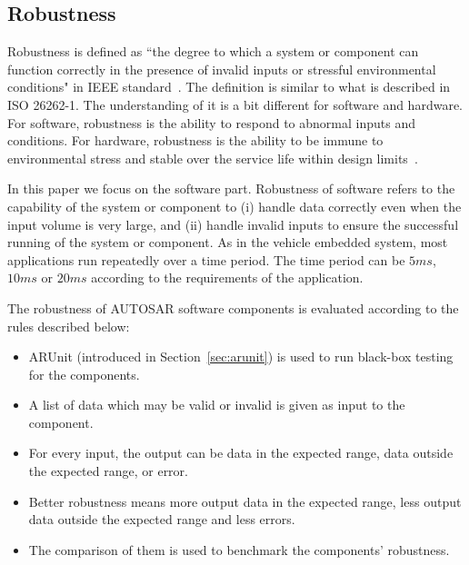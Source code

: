 \subsection{Robustness}
Robustness is defined as ``the degree to which a system or component can function correctly in the presence of invalid inputs or stressful environmental conditions" in IEEE standard~\cite{cc}. The definition is similar to what is described in ISO 26262-1. The understanding of it is a bit different for software and hardware. For software, robustness is the ability to respond to abnormal inputs and conditions. For hardware, robustness is the ability to be immune to environmental stress and stable over the service life within design limits~\cite{bb}. 

In this paper we focus on the software part. Robustness of software refers to the capability of the %
system or component to %
(i) handle data correctly even when the input volume is very large, and (ii) %
handle invalid inputs to ensure the successful running of the system or component. As in the vehicle embedded system, most applications run repeatedly over a time period. The time period can be $5ms$, $10ms$ or $20ms$ according to the requirements of the application. %

The robustness of AUTOSAR software components is evaluated according to the rules described below:
\begin{itemize}
\item ARUnit (introduced in Section~\ref{sec:arunit}) is used to run black-box testing for the components. 
\item A list of data which may be valid or invalid is given as input to the component. 
\item For every input, the output can be data in the expected range, data outside the expected range, or error. 
\item Better robustness means more output data in the expected range, less output data outside the expected range and less errors. 
\item The comparison of them is used to benchmark the %
components' robustness.
\end{itemize}

